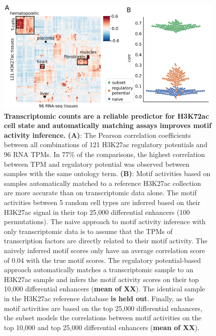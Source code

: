 \begin{figure}
    \centering
    \includegraphics[width=1\linewidth]{ch.scepia/imgs/celltypes.png}
    \caption{\textbf{Transcriptomic counts are a reliable predictor for H3K72ac cell state and automatically matching assays improves motif activity inference.} \textbf{(A)}: The Pearson correlation coefficients between all combinations of 121 H3K27ac regulatory potentials and 96 RNA TPMs. In 77\% of the comparisons, the highest correlation between TPM and regulatory potential was observed between samples with the same ontology term. \textbf{(B)}: Motif activities based on samples automatically matched to a reference H3K27ac collection are more accurate than on transcriptomic data alone. The motif activities between 5 random cell types are inferred based on their H3K27ac signal in their top 25,000 differential enhancers (100 permutations). The naive approach to motif activity inference with only transcriptomic data is to assume that the TPMs of transcription factors are directly related to their motif activity. The naively inferred motif scores only have an average correlation score of 0.04 with the true motif scores. The regulatory potential-based approach automatically matches a transcriptomic sample to an H3K27ac sample and infers the motif activity scores on their top 10,000 differential enhancers (\textbf{mean of XX}). The identical sample in the H3K27ac reference database \textbf{is held out}. Finally, as the motif activities are based on the top 25,000 differential enhancers, the subset models the correlations between motif activities on the top 10,000 and top 25,000 differential enhancers (\textbf{mean of XX}).}
    \label{fig:bulk_comparison}
\end{figure}

